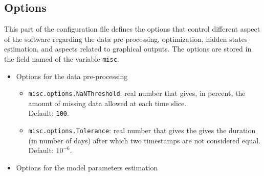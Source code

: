 \subsection{Options}
\label{SS:options}
This part of the configuration file defines the options that control different aspect of the software regarding the data pre-processing, optimization, hidden states estimation, and aspects related to graphical outputs.
The options are stored in the field named  of the \MATLAB{} variable \lstinline[basicstyle = \mlttfamily \small ]!misc!.
\begin{itemize}

\item Options for the data pre-processing

\begin{itemize}
\item \lstinline[basicstyle = \mlttfamily \small ]!misc.options.NaNThreshold!: real number that gives, in percent, the amount of missing data allowed at each time slice.\\Default: \lstinline[basicstyle = \mlttfamily \small ]!100!.
\item \lstinline[basicstyle = \mlttfamily \small ]!misc.options.Tolerance!: real number that gives the gives the duration (in number of days) after which two timestamps are not considered equal. \\Default: $10^{-6}$.

\end{itemize}


\item Options for the model parameters estimation


\end{itemize}
